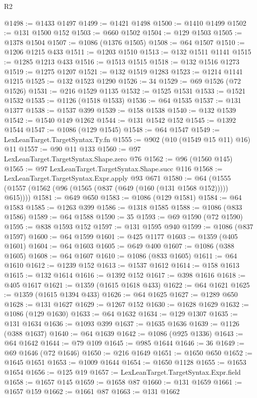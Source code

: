 \begin{lexlean}{R2}
\begin{coremodule}
@1498 := @1433 @1497
@1499 := @1421 @1498
@1500 := @1410 @1499
@1502 := @131 @1500 @152
@1503 := @660 @1502
@1504 := @129 @1503
@1505 := @1378 @1504
@1507 := @1086 (@1376 @1505)
@1508 := @64 @1507
@1510 := @1206 @1215 @433
@1511 := @1203 @1510
@1513 := @132 @1511 @1141
@1515 := @1285 @1213 @433
@1516 := @1513 @1515
@1518 := @132 @1516 @1273
@1519 := @1275 @1207
@1521 := @132 @1519 @1283
@1523 := @1214 @1141 @1215
@1525 := @132 @1523 @1290
@1526 := 34
@1529 := @69 @1526 (@72 @1526)
@1531 := @216 @1529 @1135
@1532 := @1525 @1531
@1533 := @1521 @1532
@1535 := @1126 (@1518 @1533)
@1536 := @64 @1535
@1537 := @131 @1377
@1538 := @1537 @399
@1539 := @158 @1538
@1540 := @132 @1539
@1542 := @1540 @149 @1262
@1544 := @131 @1542 @152
@1545 := @1392 @1544
@1547 := @1086 (@129 @1545)
@1548 := @64 @1547
@1549 := LexLeanTarget.TargetSyntax.Ty.fn
@1555 := @902 (@10 (@1549 @15 @11) @16) @11
@1557 := @90 @11 @133
@1560 := @97 LexLeanTarget.TargetSyntax.Shape.zero @76
@1562 := @96 (@1560 @145)
@1565 := @97 LexLeanTarget.TargetSyntax.Shape.succ @116
@1568 := LexLeanTarget.TargetSyntax.Expr.apply @93 @671
@1580 := @64 (@1555 (@1557 (@1562 (@96 (@1565 (@837 (@649 (@160 (@131 @1568 @152))))) @615))))
@1581 := @649 @650
@1583 := @1086 (@129 @1581)
@1584 := @64 @1583
@1585 := @1263 @399
@1586 := @1318 @1585
@1588 := @1086 (@833 @1586)
@1589 := @64 @1588
@1590 := 35
@1593 := @69 @1590 (@72 @1590)
@1595 := @838 @1593 @152
@1597 := @131 @1595 @940
@1599 := @1086 (@837 @1597)
@1600 := @64 @1599
@1601 := @425 @1177
@1603 := @1359 (@405 @1601)
@1604 := @64 @1603
@1605 := @649 @400
@1607 := @1086 (@388 @1605)
@1608 := @64 @1607
@1610 := @1086 (@833 @1605)
@1611 := @64 @1610
@1612 := @1239 @152
@1613 := @1537 @1612
@1614 := @158 @1613
@1615 := @132 @1614
@1616 := @1392 @152
@1617 := @398 @1616
@1618 := @405 @1617
@1621 := @1359 (@1615 @1618 @433)
@1622 := @64 @1621
@1625 := @1359 (@1615 @1394 @433)
@1626 := @64 @1625
@1627 := @1289 @650
@1628 := @131 @1627
@1629 := @1267 @152
@1630 := @1628 @1629
@1632 := @1086 (@129 @1630)
@1633 := @64 @1632
@1634 := @129 @1307
@1635 := @131 @1634
@1636 := @1093 @399
@1637 := @1635 @1636
@1639 := @1126 (@388 @1637)
@1640 := @64 @1639
@1642 := @1086 (@925 @1336)
@1643 := @64 @1642
@1644 := @79 @109
@1645 := @985 @1644
@1646 := 36
@1649 := @69 @1646 (@72 @1646)
@1650 := @216 @1649
@1651 := @1650 @650
@1652 := @1645 @1651
@1653 := @1009 @1644
@1654 := @1650 @1128
@1655 := @1653 @1654
@1656 := @125 @19
@1657 := LexLeanTarget.TargetSyntax.Expr.field
@1658 := @1657 @145
@1659 := @1658 @87
@1660 := @131 @1659
@1661 := @1657 @159
@1662 := @1661 @87
@1663 := @131 @1662

\end{coremodule}
\end{lexlean}
